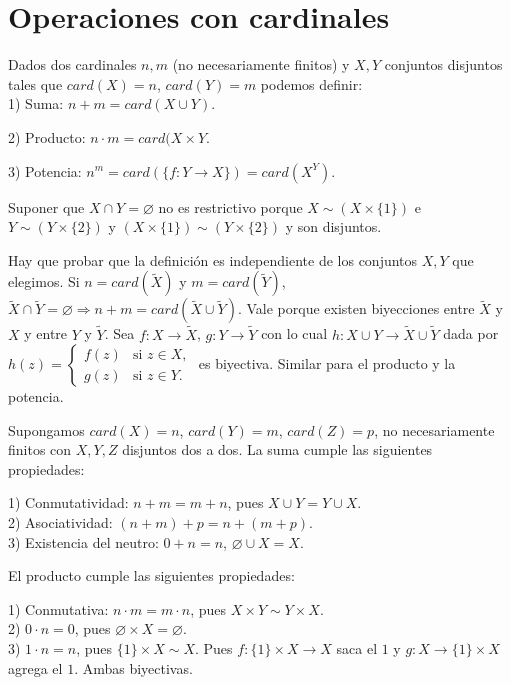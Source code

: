 \section{Operaciones con cardinales}

Dados dos cardinales $n,m$ (no necesariamente finitos) y $X, Y$ conjuntos disjuntos tales que $card(X) = n$, $card(Y) = m$ podemos definir: \\

1) Suma: $n+m = card(X \cup Y)$.

2) Producto: $n \cdot m = card(X \times Y$.

3) Potencia: $n^m = card(\{ f: Y \to X \}) = card(X^Y)$. 

\begin{note}
    Suponer que $X \cap Y = \varnothing$ no es restrictivo porque $X \sim (X \times \{1\})$ e $Y \sim (Y \times \{ 2\})$ y $(X \times \{1\}) \sim (Y \times \{ 2\})$ y son disjuntos.
\end{note}

\begin{note}
    Hay que probar que la definición es independiente de los conjuntos $X, Y$ que elegimos.
    Si $n = card(\tilde{X})$ y $m = card(\tilde{Y})$, $\tilde{X} \cap \tilde{Y} = \varnothing \Rightarrow n+m=card(\tilde{X} \cup \tilde{Y})$. Vale porque existen biyecciones entre $\tilde{X}$ y $X$ y entre $Y$ y $\tilde{Y}$.
    Sea $f: X \to \tilde{X}$, $g:Y \to \tilde{Y}$ con lo cual $h: X \cup Y \to \tilde{X} \cup \tilde{Y}$ dada por $h(z) = \begin{cases}
        f(z) & \text{si } z\in X, \\
        g(z) & \text{si } z \in Y.
    \end{cases}$ es biyectiva.
    Similar para el producto y la potencia.
\end{note}

Supongamos $card(X) = n$, $card(Y) = m$, $card(Z) = p$, no necesariamente finitos con $X, Y,Z$ disjuntos dos a dos. La suma cumple las siguientes propiedades:
\begin{prop}
    1) Conmutatividad: $n+m=m+n$, pues $X \cup Y = Y \cup X$. \\
    2) Asociatividad: $(n+m)+p=n+(m+p)$. \\
    3) Existencia del neutro: $0+n=n$, $\varnothing \cup X=X$. \\
\end{prop}

El producto cumple las siguientes propiedades:
\begin{prop}
    1) Conmutativa: $n \cdot m = m \cdot n$, pues $X \times Y \sim Y \times X$. \\
    2) $0 \cdot n = 0 $, pues $\varnothing \times X = \varnothing $. \\
    3) $1 \cdot n = n$, pues $\{ 1 \} \times X \sim X$. Pues $f: \{ 1 \} \times X \to X$ saca el $1$ y $g: X \to \{ 1 \} \times X$ agrega el $1$. Ambas biyectivas.
\end{prop}

